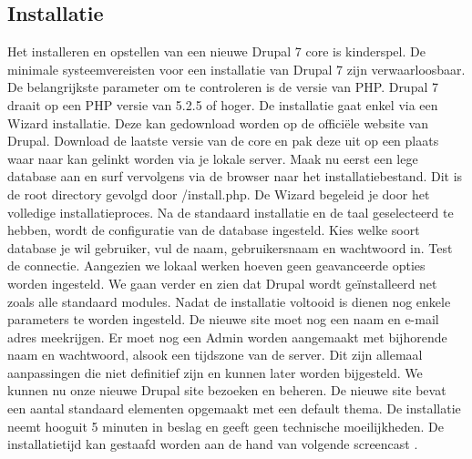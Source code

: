 \subsection{Installatie}
Het installeren en opstellen van een nieuwe Drupal 7 core is kinderspel. De minimale systeemvereisten voor een installatie van Drupal 7 zijn verwaarloosbaar. De belangrijkste parameter om te controleren is de versie van PHP. Drupal 7 draait op een PHP versie van 5.2.5 of hoger. 
\newline\newline
De installatie gaat enkel via een Wizard installatie. Deze kan gedownload worden op de officiële website van Drupal. Download de laatste versie van de core en pak deze uit op een plaats waar naar kan gelinkt worden via je lokale server.
Maak nu eerst een lege database aan en surf vervolgens via de browser naar het installatiebestand. Dit is de root directory gevolgd door /install.php. De Wizard begeleid je door het volledige installatieproces. Na de standaard installatie en de taal geselecteerd te hebben, wordt de configuratie van de database ingesteld. Kies welke soort database je wil gebruiker, vul de naam, gebruikersnaam en wachtwoord in. Test de connectie. Aangezien we lokaal werken hoeven geen geavanceerde opties worden ingesteld. We gaan verder en zien dat Drupal wordt geïnstalleerd net zoals alle standaard modules.
\newline\newline
Nadat de installatie voltooid is dienen nog enkele parameters te worden ingesteld. De nieuwe site moet nog een naam en e-mail adres meekrijgen. Er moet nog een Admin worden aangemaakt met bijhorende naam en wachtwoord, alsook een tijdszone van de server. Dit zijn allemaal aanpassingen die niet definitief zijn en kunnen later worden bijgesteld.
\newline\newline
We kunnen nu onze nieuwe Drupal site bezoeken en beheren. De nieuwe site bevat een aantal standaard elementen opgemaakt met een default thema.
\newline\newline
De installatie neemt hooguit 5 minuten in beslag en geeft geen technische moeilijkheden. De installatietijd kan gestaafd worden aan de hand van volgende screencast \citep{LearnByTheDrop2011Installing7}.


